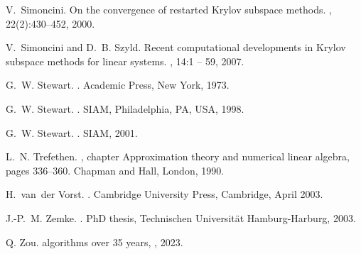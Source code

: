 \documentclass{article}
\begin{document}
\begin{thebibliography}{100}
     V.~Simoncini. \newblock On the convergence of restarted {Krylov} subspace
    methods. ,
  22(2):430--452, 2000.

 
     V.~Simoncini and D.~B. Szyld. \newblock Recent computational developments in
    {Krylov} subspace methods for
  linear systems.
, 14:1 -- 59, 2007.

	
     G.~W. Stewart. . \newblock
    Academic Press, New York, 1973.

     G.~W. Stewart. .
    \newblock SIAM, Philadelphia, PA, USA, 1998.


	 G.~W. Stewart. . \newblock
	SIAM, 2001.
	
	 L.~N. Trefethen. , chapter
    Approximation theory
  and numerical linear algebra, pages 336--360.
\newblock Chapman and Hall, London, 1990.


	
	
 H.~van~der Vorst. .
\newblock Cambridge University Press, Cambridge, April 2003.
	
	

	

 J.-P.~M. Zemke. .
\newblock PhD thesis, Technischen Universität Hamburg-Harburg, 2003.
	
	
  Q. Zou.
 algorithms over 35 years,
   ,
 2023.
		



	
	
	\markboth{}{}
	
\end{thebibliography}
\end{document}
